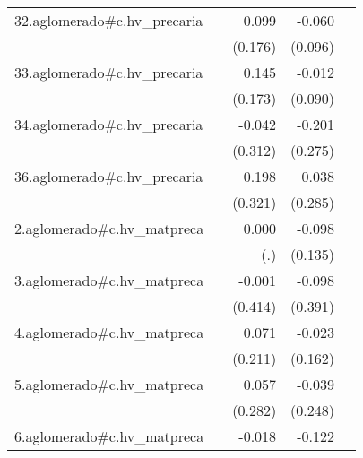 {\begin{longtable}{l*{4}{D{.}{.}{-1}}}
\addlinespace
32.aglomerado#c.hv\_precaria&                     &       0.099         &      -0.060         &                     \\
            &                     &     (0.176)         &     (0.096)         &                     \\
\addlinespace
33.aglomerado#c.hv\_precaria&                     &       0.145         &      -0.012         &                     \\
            &                     &     (0.173)         &     (0.090)         &                     \\
\addlinespace
34.aglomerado#c.hv\_precaria&                     &      -0.042         &      -0.201         &                     \\
            &                     &     (0.312)         &     (0.275)         &                     \\
\addlinespace
36.aglomerado#c.hv\_precaria&                     &       0.198         &       0.038         &                     \\
            &                     &     (0.321)         &     (0.285)         &                     \\
\addlinespace
2.aglomerado#c.hv\_matpreca&                     &       0.000         &      -0.098         &                     \\
            &                     &         (.)         &     (0.135)         &                     \\
\addlinespace
3.aglomerado#c.hv\_matpreca&                     &      -0.001         &      -0.098         &                     \\
            &                     &     (0.414)         &     (0.391)         &                     \\
\addlinespace
4.aglomerado#c.hv\_matpreca&                     &       0.071         &      -0.023         &                     \\
            &                     &     (0.211)         &     (0.162)         &                     \\
\addlinespace
5.aglomerado#c.hv\_matpreca&                     &       0.057         &      -0.039         &                     \\
            &                     &     (0.282)         &     (0.248)         &                     \\
\addlinespace
6.aglomerado#c.hv\_matpreca&                     &      -0.018         &      -0.122         &                     \\

\end{longtable}}
